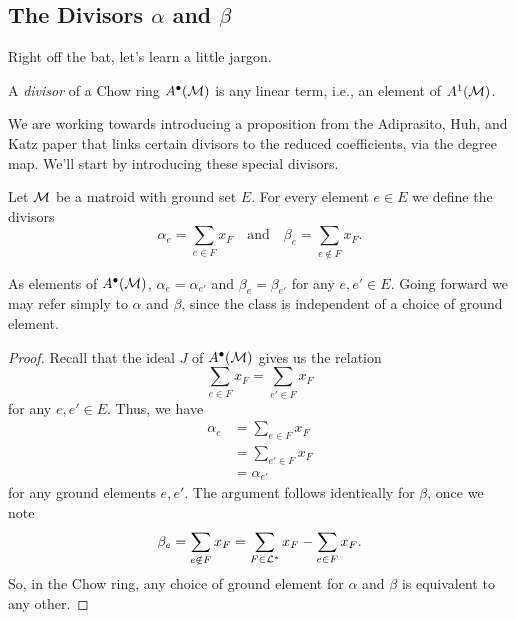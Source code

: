 \documentclass[12pt,oneside]{../../sfsuthesis}
\begin{document}
\subsection{The Divisors \texorpdfstring{\( \alpha \)}{alpha} and \texorpdfstring{\( \beta \)}{beta}}
Right off the bat, let's learn a little jargon.
\begin{definition}[Divisor]
    A \emph{divisor} of a Chow ring \( A^\bullet(\mathcal{M}) \) is any linear term, i.e., an element of \( A^1(\mathcal{M}) \).
\end{definition}
We are working towards introducing a proposition from the Adiprasito, Huh, and Katz paper that links certain divisors to the reduced coefficients, via the degree map.
We'll start by introducing these special divisors.
\begin{definition}\label{def:alphaBeta}
    Let \( \mathcal{M} \) be a matroid with ground set \( E \).
    For every element \( e \in E \) we define the divisors
    \[
        \alpha_e = \sum_{e \in F} x_F \quad \text{and} \quad \beta_e = \sum_{e \notin F}x_F.
    \]
\end{definition}
\begin{proposition}
    As elements of \( A^\bullet(\mathcal{M}) \), \(\alpha_{e} = \alpha_{e'} \) and \(\beta_{e} = \beta_{e'} \) for any \( e, e' \in E \).
    Going forward we may refer simply to \( \alpha \) and \( \beta \), since the class is independent of a choice of ground element.
\end{proposition}
\begin{proof}
    Recall that the ideal \( J \) of \( A^\bullet(\mathcal{M}) \) gives us the relation
    \[
        \sum_{e \in F} x_F = \sum_{e' \in F} x_F
    \]
    for any \( e, e' \in E \).
    Thus, we have
    \begin{align*}
        \alpha_{e} & = \sum_{e \in F} x_F  \\
                   & = \sum_{e' \in F} x_F \\
                   & = \alpha_{e'}
    \end{align*}
    for any ground elements \( e, e' \).
    The argument follows identically for \( \beta \), once we note
    \[
        \beta_e =  \sum_{e \notin F} x_F = \sum_{F \in \mathcal{L}^\ast} x_F - \sum_{e \in F} x_F.
    \]
    So, in the Chow ring, any choice of ground element for \( \alpha \) and \( \beta \) is equivalent to any other.
\end{proof}
\end{document}

